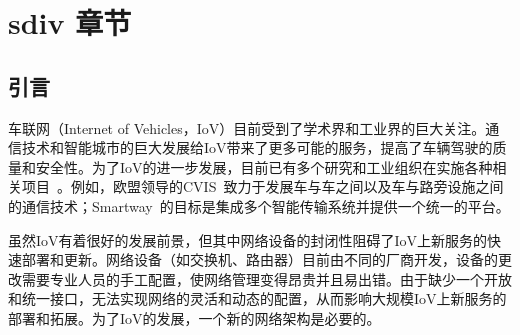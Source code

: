 \chapter{sdiv 章节}
\section{引言}

车联网（Internet of Vehicles，IoV）目前受到了学术界和工业界的巨大关注。通信技术和智能城市的巨大发展给IoV带来了更多可能的服务，提高了车辆驾驶的质量和安全性。为了IoV的进一步发展，目前已有多个研究和工业组织在实施各种相关项目~\cite{CVIS, makino2005smartway}。例如，欧盟领导的CVIS~\cite{CVIS}致力于发展车与车之间以及车与路旁设施之间的通信技术；Smartway~\cite{makino2005smartway}的目标是集成多个智能传输系统并提供一个统一的平台。


虽然IoV有着很好的发展前景，但其中网络设备的封闭性阻碍了IoV上新服务的快速部署和更新。网络设备（如交换机、路由器）目前由不同的厂商开发，设备的更改需要专业人员的手工配置，使网络管理变得昂贵并且易出错。由于缺少一个开放和统一接口，无法实现网络的灵活和动态的配置，从而影响大规模IoV上新服务的部署和拓展。为了IoV的发展，一个新的网络架构是必要的。



